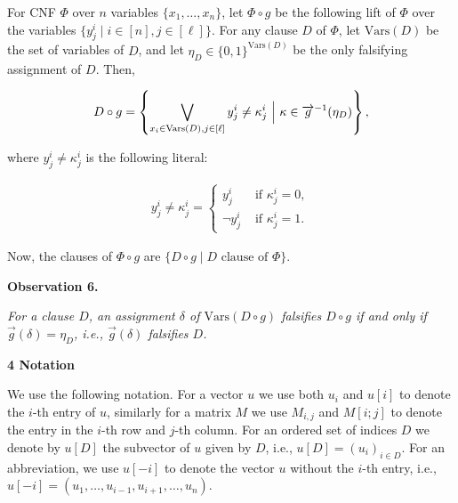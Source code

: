 \documentclass[10pt,a4paper]{article}
\begin{document}
For CNF $\Phi$ over $n$ variables $\{x_{1},\dots,x_{n}\}$, let $\Phi\circ g$ be the following lift of $\Phi$ over the variables $\{y^{i}_{j}\mid i\in[n],j\in[\ell]\}$.
For any clause $D$ of $\Phi$, let $\text{Vars}(D)$ be the set of variables of $D$, and let $\eta_{D}\in\{0,1\}^{\text{Vars}(D)}$ be the only falsifying assignment of $D$.
Then,\par


\[\begin{gathered}
D\circ g=\left\{\bigvee_{x_{i}\in\text{Vars}(D),j\in[\ell]}y^{i}_{j}\neq\kappa%
^{i}_{j}\nobreak\ \Bigl{|}\nobreak\ \kappa\in%
\overrightarrow{g}^{-1}(\eta_{D})\right\},
\end{gathered}\]


where $y^{i}_{j}\neq\kappa^{i}_{j}$ is the following literal:\par


\[\begin{gathered}
y^{i}_{j}\neq\kappa^{i}_{j}=\begin{cases}y^{i}_{j}&\text{ if }\kappa^{i}_{j}=0%
,\\
\neg y^{i}_{j}&\text{ if }\kappa^{i}_{j}=1.\end{cases}
\end{gathered}\]


Now, the clauses of $\Phi\circ g$ are $\{D\circ g\mid D\text{ clause of }\Phi\}$.\par





\par\medskip\noindent\textbf{
\textbf{Observation 6}\textbf{.}
}\par



\emph{For a clause $D$, an assignment $\delta$ of $\text{Vars}(D\circ g)$ falsifies $D\circ g$ if and only if $\overrightarrow{g}(\delta)=\eta_{D}$, i.e., $\overrightarrow{g}(\delta)$ falsifies $D$.}\par







\par\medskip\noindent\textbf{
4 Notation}\par




We use the following notation.
For a vector $u$ we use both $u_{i}$ and $u[i]$ to denote the $i$-th entry of $u$, similarly for a matrix $M$ we use $M_{i,j}$ and $M[i;j]$ to denote the entry in the $i$-th row and $j$-th column.
For an ordered set of indices $D$ we denote by $u[D]$ the subvector of $u$ given by $D$, i.e., $u[D]=(u_{i})_{i\in D}$.
For an abbreviation, we use $u[-i]$ to denote the vector $u$ without the $i$-th entry, i.e., $u[-i]=(u_{1},\dots,u_{i-1},u_{i+1},\dots,u_{n})$.\par
\end{document}
